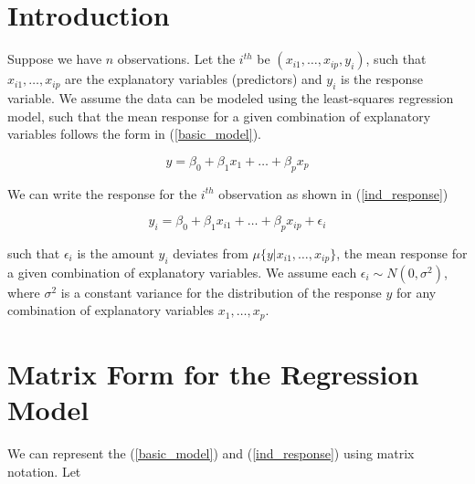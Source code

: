 \documentclass[]{book}
\begin{document}
\section{Introduction}\label{introduction-3}

Suppose we have \(n\) observations. Let the \(i^{th}\) be
\((x_{i1}, \ldots, x_{ip}, y_i)\), such that \(x_{i1}, \ldots, x_{ip}\)
are the explanatory variables (predictors) and \(y_i\) is the response
variable. We assume the data can be modeled using the least-squares
regression model, such that the mean response for a given combination of
explanatory variables follows the form in (\ref{basic_model}).

\begin{equation}
\label{basic_model}
y = \beta_0 + \beta_1 x_1 + \dots + \beta_p x_p 
\end{equation}

We can write the response for the \(i^{th}\) observation as shown in
(\ref{ind_response})

\begin{equation}
\label{ind_response}
y_i = \beta_0 + \beta_1 x_{i1} + \dots + \beta_p x_{ip} + \epsilon_i 
\end{equation}

such that \(\epsilon_i\) is the amount \(y_i\) deviates from
\(\mu\{y|x_{i1}, \ldots, x_{ip}\}\), the mean response for a given
combination of explanatory variables. We assume each
\(\epsilon_i \sim N(0,\sigma^2)\), where \(\sigma^2\) is a constant
variance for the distribution of the response \(y\) for any combination
of explanatory variables \(x_1, \ldots, x_p\).

\section{Matrix Form for the Regression
Model}\label{matrix-form-for-the-regression-model-1}

We can represent the (\ref{basic_model}) and (\ref{ind_response}) using
matrix notation. Let
\end{document}
